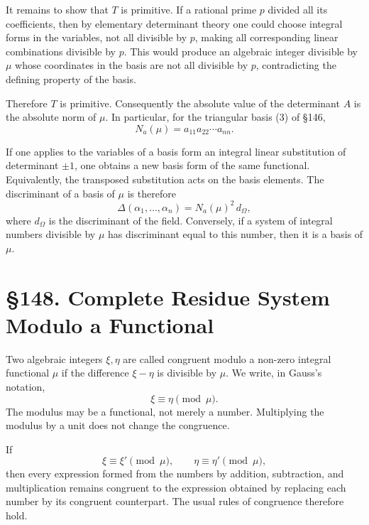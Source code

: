 \documentclass[12pt,a4paper]{article}
\newcommand{\webersection}[2]{\clearpage\section*{\S #1. #2}}
\begin{document}
It remains to show that \(T\) is primitive.  If a rational prime \(p\) divided all its coefficients, then by elementary determinant theory one could choose integral forms in the variables, not all divisible by \(p\), making all corresponding linear combinations divisible by \(p\).  This would produce an algebraic integer divisible by \(\mu\) whose coordinates in the basis are not all divisible by \(p\), contradicting the defining property of the basis.

Therefore \(T\) is primitive.  Consequently the absolute value of the determinant \(A\) is the absolute norm of \(\mu\).  In particular, for the triangular basis (3) of \S 146,
\begin{equation}
 N_a(\mu)=a_{11}a_{22}
\cdots a_{nn}. \tag{5}
\end{equation}

If one applies to the variables of a basis form an integral linear substitution of determinant \(\pm1\), one obtains a new basis form of the same functional.  Equivalently, the transposed substitution acts on the basis elements.  The discriminant of a basis of \(\mu\) is therefore
\begin{equation}
 \Delta(\alpha_1,
\ldots,
\alpha_n)=N_a(\mu)^2\,d_\Omega, \tag{6}
\end{equation}
where \(d_\Omega\) is the discriminant of the field.  Conversely, if a system of integral numbers divisible by \(\mu\) has discriminant equal to this number, then it is a basis of \(\mu\).

\webersection{148}{Complete Residue System Modulo a Functional}

Two algebraic integers \(\xi,\eta\) are called congruent modulo a non-zero integral functional \(\mu\) if the difference \(\xi-
\eta\) is divisible by \(\mu\).  We write, in Gauss's notation,
\begin{equation}
 \xi\equiv\eta\pmod{\mu}. \tag{1}
\end{equation}
The modulus may be a functional, not merely a number.  Multiplying the modulus by a unit does not change the congruence.

If
\[
 \xi\equiv\xi'\pmod{\mu},
\qquad
 \eta\equiv\eta'\pmod{\mu},
\]
then every expression formed from the numbers by addition, subtraction, and multiplication remains congruent to the expression obtained by replacing each number by its congruent counterpart.  The usual rules of congruence therefore hold.
\end{document}
